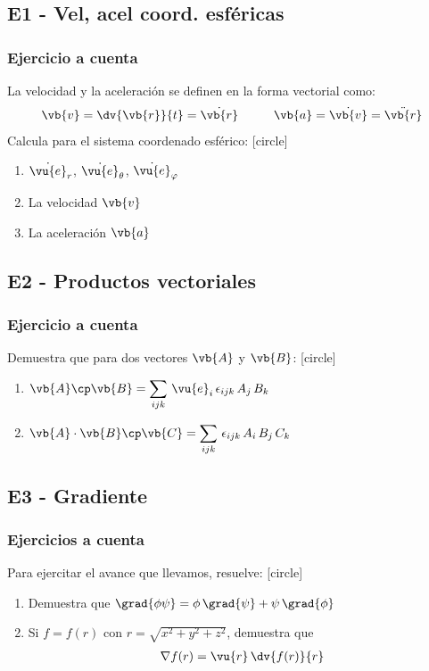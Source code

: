 \subsection{E1 - Vel, acel coord. esféricas}
\begin{frame}
\frametitle{Ejercicio a cuenta}
La velocidad y la aceleración se definen en la forma vectorial como:
\begin{align*}
\vb{v} = \dv{\vb{r}}{t} = \dot{\vb{r}} \hspace{1cm} \vb{a} = \dot{\vb{v}} = \ddot{\vb{r}}
\end{align*}
Calcula para el sistema coordenado esférico:
[circle]
\begin{enumerate}
\item $\dot{\vu{e}}_{r}$, $\dot{\vu{e}}_{\theta}$, $\dot{\vu{e}}_{\varphi}$ 
\item La velocidad $\vb{v}$
\item La aceleración $\vb{a}$
\end{enumerate}
\end{frame}
\subsection{E2 - Productos vectoriales}
\begin{frame}
\frametitle{Ejercicio a cuenta}
Demuestra que para dos vectores $\vb{A}$ y $\vb{B}$:
[circle]
\begin{enumerate}
\item $\vb{A} \cp \vb{B} = \displaystyle \sum_{ijk} \, \vu{e}_{i} \, \epsilon_{ijk} \, A_{j} \, B_{k}$ \\[1em]
\item $\vb{A} \cdot \vb{B} \cp \vb{C} = \displaystyle \sum_{ijk} \, \epsilon_{ijk} \, A_{i} \, B_{j} \, C_{k}$
\end{enumerate}
\end{frame}
\subsection{E3 - Gradiente}
\begin{frame}
\frametitle{Ejercicios a cuenta}
Para ejercitar el avance que llevamos, resuelve:
[circle]
\begin{enumerate}
\item Demuestra que $\grad{\phi \psi} = \phi \, \grad{\psi} + \psi \, \grad{\phi}$
\item Si $f = f(r)$ con $r = \sqrt{x^{2} + y^{2}+ z^{2}}$, demuestra que
\begin{align*}
\nabla{f(r)} = \vu{r} \, \dv{f(r)}{r}
\end{align*}
\end{enumerate}
\end{frame}
